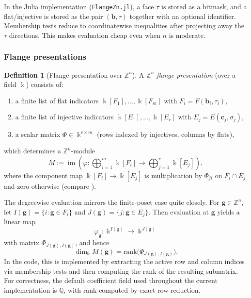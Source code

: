 \documentclass{article}
\newcommand{\kk}{\Bbbk}
\newcommand{\<}{\langle}
\renewcommand{\>}{\rangle}
\DeclareMathOperator{\im}{im}
\theoremstyle{definition}
\newtheorem{defn}[theorem]{Definition}
\theoremstyle{remark}
\begin{document}
	In the Julia implementation (\texttt{FlangeZn.jl}), a face $\tau$ is stored as a bitmask, and a flat/injective is stored as the pair $(\mathbf{b},\tau)$ together with an optional identifier.  Membership tests reduce to coordinatewise inequalities after projecting away the $\tau$ directions. This makes evaluation cheap even when $n$ is moderate.
	
	\subsubsection*{Flange presentations}
	
	\begin{defn}[Flange presentation over $\mathbb{Z}^n$]\label{def:flange-presentation}
		A \emph{$\mathbb{Z}^n$ flange presentation} (over a field $\kk$) consists of:
		\begin{enumerate}[label=(\roman*)]
			\item a finite list of flat indicators $\kk[F_1],\dots,\kk[F_m]$ with $F_i=F(\mathbf{b}_i,\tau_i)$,
			\item a finite list of injective indicators $\kk[E_1],\dots,\kk[E_r]$ with $E_j=E(\mathbf{c}_j,\sigma_j)$,
			\item a scalar matrix $\Phi\in \kk^{r\times m}$ (rows indexed by injectives, columns by flats),
		\end{enumerate}
		which determines a $\mathbb{Z}^n$-module
		\[
		M := \im\!\left(\varphi \colon \bigoplus_{i=1}^m \kk[F_i] \longrightarrow \bigoplus_{j=1}^r \kk[E_j]\right),
		\]
		where the component map $\kk[F_i]\to \kk[E_j]$ is multiplication by $\Phi_{ji}$ on $F_i\cap E_j$ and zero otherwise
		(compare \cite[Rems.~5.5 and 5.11, Def.~5.14]{Mil20}).
	\end{defn}
	
	The degreewise evaluation mirrors the finite-poset case quite closely.  For $\mathbf{g}\in\mathbb{Z}^n$,
	let $I(\mathbf{g})=\{i : \mathbf{g}\in F_i\}$ and $J(\mathbf{g})=\{j : \mathbf{g}\in E_j\}$.
	Then evaluation at $\mathbf{g}$ yields a linear map
	\[
	\varphi_{\mathbf{g}} \colon \kk^{I(\mathbf{g})} \longrightarrow \kk^{J(\mathbf{g})}
	\]
	with matrix $\Phi_{J(\mathbf{g}),I(\mathbf{g})}$, and hence
	\[
	\dim_\kk M(\mathbf{g}) = \mathrm{rank}\big(\Phi_{J(\mathbf{g}),I(\mathbf{g})}\big).
	\]
	In the code, this is implemented by extracting the active row and column indices via membership tests
	and then computing the rank of the resulting submatrix.  For correctness, the default coefficient field used
	throughout the current implementation is $\mathbb{Q}$, with rank computed by exact row reduction.
	
\end{document}
